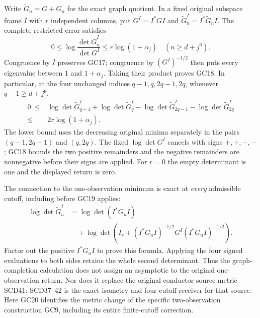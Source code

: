 \documentclass[11pt,a4paper]{article}
\theoremstyle{definition}\newtheorem{definition}[theorem]{Definition}
\begin{document}
Write $\widetilde G_n=G+G_n$ for the exact graph quotient. In a
fixed original subspace frame $I$ with $r$ independent columns,
put $G^I=I^*GI$ and $\widetilde G_n^I=I^*\widetilde G_nI$.
The complete restricted error satisfies
\[
 0\le \log\frac{\det\widetilde G_n^I}{\det G^I}
       \le r\log(1+\alpha_j)\quad(n\ge d+j^6).
 \tag{GC18}\label{gc:restriction-error}
\]
Congruence by $I$ preserves GC17; congruence by $(G^I)^{-1/2}$
then puts every eigenvalue between $1$ and $1+\alpha_j$.
Taking their product proves GC18. In particular, at the four
unchanged indices $q-1,q,2q-1,2q$, whenever $q-1\ge d+j^6$,
\[
\begin{split}
0\ \le{}&\log\det\widetilde G_{q-1}^I
 +\log\det\widetilde G_q^I
 -\log\det\widetilde G_{2q-1}^I
 -\log\det\widetilde G_{2q}^I\\
 \le{}&2r\log(1+\alpha_j).
\end{split}
 \tag{GC19}\label{gc:four-cutoff}
\]
The lower bound uses the decreasing original minima separately
in the pairs $(q-1,2q-1)$ and $(q,2q)$. The fixed $\log\det G^I$
cancels with signs $+,+,-,-$; GC18 bounds the two positive
remainders and the negative remainders are nonnegative before
their signs are applied. For $r=0$ the empty determinant is one
and the displayed return is zero.

The connection to the one-observation minimum is exact at
\emph{every} admissible cutoff, including before GC19 applies:
\[
\begin{split}
\log\det\widetilde G_n^I
 &=\log\det(I^*G_nI)\\
 &\quad+\log\det\left(
 I_r+(I^*G_nI)^{-1/2}G^I(I^*G_nI)^{-1/2}\right).
\end{split}
 \tag{GC20}\label{gc:native-correction}
\]
Factor out the positive $I^*G_nI$ to prove this formula. Applying
the four signed evaluations to both sides retains the whole
second determinant. Thus the graph-completion calculation does
not assign an asymptotic to the original one-observation return.
Nor does it replace the original conductor source metric
SCD41: SCD37--42 is the exact isometry and four-cutoff receiver
for that source. Here GC20 identifies the metric change of the
specific two-observation construction GC9, including its entire
finite-cutoff correction.
\end{document}

